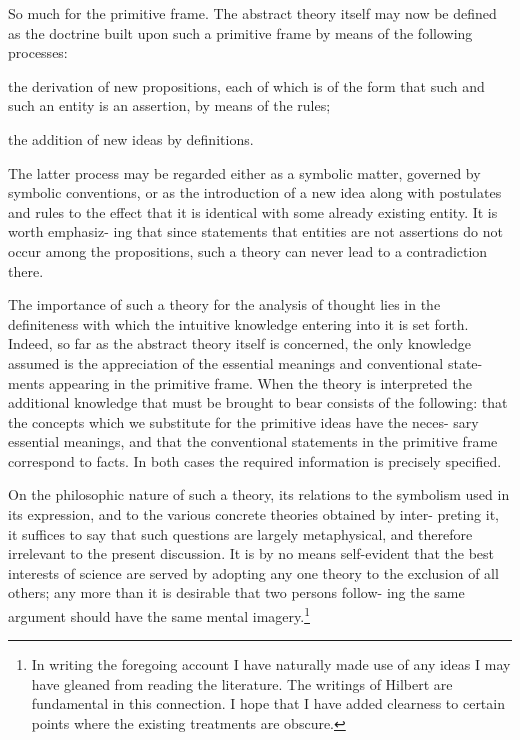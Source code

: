 \documentclass[10pt, twoside]{extarticle}
\theoremstyle{breaktheorem}
\theoremstyle{mylemma}
\theoremstyle{mydefinition}
\theoremstyle{mycorollary}
\begin{document}
So much for the primitive frame. The abstract theory itself may now be
defined as the doctrine built upon such a primitive frame by means of the
following processes: \begin{enumerate*}[label=\arabic*)] \item the derivation of new propositions, each of which is of
the form that such and such an entity is an assertion, by means of the rules;
\item the addition of new ideas by definitions. \end{enumerate*} The latter process may be
regarded either as a symbolic matter, governed by symbolic conventions, or as
the introduction of a new idea along with postulates and rules to the effect
that it is identical with some already existing entity. It is worth emphasiz-
ing that since statements that entities are not assertions do not occur among
the propositions, such a theory can never lead to a contradiction there.

The importance of such a theory for the analysis of thought lies in the
definiteness with which the intuitive knowledge entering into it is set forth.
Indeed, so far as the abstract theory itself is concerned, the only knowledge
assumed is the appreciation of the essential meanings and conventional state-
ments appearing in the primitive frame. When the theory is interpreted the
additional knowledge that must be brought to bear consists of the following:
that the concepts which we substitute for the primitive ideas have the neces-
sary essential meanings, and that the conventional statements in the primitive
frame correspond to facts. In both cases the required information is precisely
specified.

On the philosophic nature of such a theory, its relations to the symbolism
used in its expression, and to the various concrete theories obtained by inter-
preting it, it suffices to say that such questions are largely metaphysical, and
therefore irrelevant to the present discussion. It is by no means self-evident
that the best interests of science are served by adopting any one theory to the
exclusion of all others; any more than it is desirable that two persons follow-
ing the same argument should have the same mental imagery.\footnote{In writing the foregoing account I have naturally made use of any ideas I may have gleaned from reading the literature. The writings of Hilbert are fundamental in this connection. I hope that I have added clearness to certain points where the existing treatments are obscure.}
\end{document}
